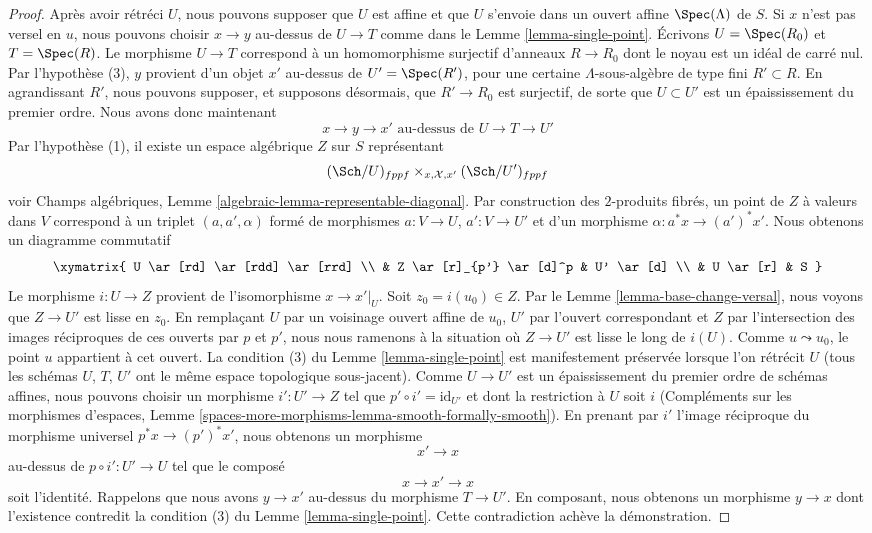 \begin{proof}
Après avoir rétréci $U$, nous pouvons supposer que $U$ est affine et que $U$ s'envoie dans un
ouvert affine $\Spec(\Lambda)$ de $S$. Si $x$ n'est pas versel en $u$, nous
pouvons choisir $x \to y$ au-dessus de $U \to T$ comme dans le
Lemme \ref{lemma-single-point}. Écrivons $U = \Spec(R_0)$ et $T = \Spec(R)$.
Le morphisme $U \to T$ correspond à un homomorphisme surjectif d'anneaux
$R \to R_0$ dont le noyau est un idéal de carré nul.
Par l'hypothèse (3), $y$ provient d'un objet $x'$ au-dessus de
$U' = \Spec(R')$, pour une certaine $\Lambda$-sous-algèbre de type fini
$R' \subset R$. En agrandissant $R'$, nous pouvons supposer, et supposons désormais, que
$R' \to R_0$ est surjectif, de sorte que $U \subset U'$ est un épaississement du premier ordre.
Nous avons donc maintenant
$$
x \to y \to x'
\text{ au-dessus de }
U \to T \to U'
$$
Par l'hypothèse (1), il existe un espace algébrique $Z$ sur $S$ représentant
$$
(\Sch/U)_{fppf} \times_{x, \mathcal{X}, x'} (\Sch/U')_{fppf}
$$
voir Champs algébriques, Lemme \ref{algebraic-lemma-representable-diagonal}.
Par construction des $2$-produits fibrés, un point de $Z$ à valeurs dans $V$
correspond à un triplet $(a, a', \alpha)$ formé de morphismes
$a : V \to U$, $a' : V \to U'$ et d'un morphisme $\alpha : a^*x \to (a')^*x'$.
Nous obtenons un diagramme commutatif
$$
\xymatrix{
U \ar[rd] \ar[rdd] \ar[rrd] \\
& Z \ar[r]_{p'} \ar[d]^p & U' \ar[d] \\
& U \ar[r] & S
}
$$
Le morphisme $i : U \to Z$ provient de l'isomorphisme $x \to x'|_U$.
Soit $z_0 = i(u_0) \in Z$. Par le Lemme \ref{lemma-base-change-versal},
nous voyons que $Z \to U'$ est lisse en $z_0$. En remplaçant $U$ par un
voisinage ouvert affine de $u_0$, $U'$ par l'ouvert correspondant
et $Z$ par l'intersection des images réciproques
de ces ouverts par $p$ et $p'$, nous nous ramenons à la situation où
$Z \to U'$ est lisse le long de $i(U)$. Comme $u \leadsto u_0$, le point
$u$ appartient à cet ouvert. La condition (3) du Lemme \ref{lemma-single-point}
est manifestement préservée lorsque l'on rétrécit $U$ (tous les schémas $U$, $T$, $U'$
ont le même espace topologique sous-jacent).
Comme $U \to U'$ est un épaississement du premier ordre de schémas affines,
nous pouvons choisir un morphisme $i' : U' \to Z$
tel que $p' \circ i' = \text{id}_{U'}$ et
dont la restriction à $U$ soit $i$
(Compléments sur les morphismes d'espaces, Lemme
\ref{spaces-more-morphisms-lemma-smooth-formally-smooth}).
En prenant par $i'$ l'image réciproque du morphisme universel $p^*x \to (p')^*x'$,
nous obtenons un morphisme
$$
x' \to x
$$
au-dessus de $p \circ i' : U' \to U$ tel que le composé
$$
x \to x' \to x
$$
soit l'identité. Rappelons que nous avons $y \to x'$ au-dessus du
morphisme $T \to U'$. En composant, nous obtenons un morphisme
$y \to x$ dont l'existence contredit la condition
(3) du Lemme \ref{lemma-single-point}.
Cette contradiction achève la démonstration.
\end{proof}






